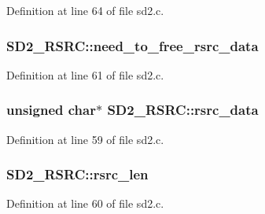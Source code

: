 Definition at line 64 of file sd2.\+c.

\subsubsection[{\texorpdfstring{need\+\_\+to\+\_\+free\+\_\+rsrc\+\_\+data}{need_to_free_rsrc_data}}]{ S\+D2\+\_\+\+R\+S\+R\+C\+::need\+\_\+to\+\_\+free\+\_\+rsrc\+\_\+data}\hypertarget{struct_s_d2___r_s_r_c_af28995008ac1e02abf50177adcd61da8}{}\label{struct_s_d2___r_s_r_c_af28995008ac1e02abf50177adcd61da8}


Definition at line 61 of file sd2.\+c.

\subsubsection[{\texorpdfstring{rsrc\+\_\+data}{rsrc_data}}]{\setlength{\rightskip}{0pt plus 5cm}unsigned char$\ast$ S\+D2\+\_\+\+R\+S\+R\+C\+::rsrc\+\_\+data}\hypertarget{struct_s_d2___r_s_r_c_a92dba91b4f50afe7c8cd82d8eace6ea0}{}\label{struct_s_d2___r_s_r_c_a92dba91b4f50afe7c8cd82d8eace6ea0}


Definition at line 59 of file sd2.\+c.

\subsubsection[{\texorpdfstring{rsrc\+\_\+len}{rsrc_len}}]{ S\+D2\+\_\+\+R\+S\+R\+C\+::rsrc\+\_\+len}\hypertarget{struct_s_d2___r_s_r_c_a2c635d835a86076b87b432d8090424a7}{}\label{struct_s_d2___r_s_r_c_a2c635d835a86076b87b432d8090424a7}


Definition at line 60 of file sd2.\+c.

